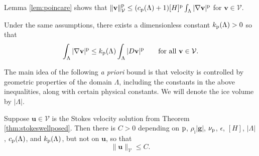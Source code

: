 \documentclass[hidelinks,onefignum,onetabnum,final]{siamart220329}  %
\newcommand{\eps}{\epsilon}
\newcommand{\grad}{\nabla}
\newcommand{\bg}{\mathbf{g}}
\newcommand{\bu}{\mathbf{u}}
\newcommand{\bv}{\mathbf{v}}
\newcommand{\cV}{\mathcal{V}}
\newcommand{\pp}{{\text{\textnormal{p}}}}
\newcommand{\rhoi}{\rho_{\text{i}}}
\begin{document}
Lemma \ref{lem:poincare} shows that $\|\bv\|_{\cV}^\pp \le (c_{\pp}(\Lambda) + 1) [H]^\pp \int_\Lambda |\grad\bv|^\pp$ for $\bv \in \cV$.
 
\begin{lemma} \label{lem:korns}
Under the same assumptions, there exists a dimensionless constant $k_{\pp}(\Lambda)>0$ so that
\begin{equation}
\int_\Lambda |\grad\bv|^\pp \le k_{\pp}(\Lambda) \int_\Lambda |D\bv|^\pp \qquad \text{for all } \bv \in \cV. \label{eq:korns}
\end{equation}
\end{lemma}

The main idea of the following \emph{a priori}  bound is that velocity is controlled by geometric properties of the domain $\Lambda$, including the constants in the above inequalities, along with certain physical constants.  We will denote the ice volume by $|\Lambda|$.

\begin{lemma} \label{lem:stokesapriori}
Suppose $\bu\in\cV$ is the Stokes velocity solution from Theorem \ref{thm:stokeswellposed}.  Then there is $C>0$ depending on $\pp$, $\rhoi |\bg|$, $\nu_\pp$, $\eps$, $[H]$, $|\Lambda|$, $c_\pp(\Lambda)$, and $k_\pp(\Lambda)$, but not on $\bu$, so that
\begin{equation}
\|\bu\|_{\cV} \le C. \label{eq:stokesapriori}
\end{equation}
\end{lemma}
\end{document}
